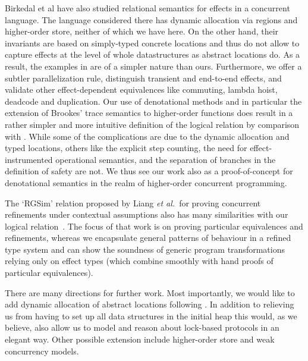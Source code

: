 \documentclass[nocopyrightspace,preprint]{sigplanconf}
\newcommand\etal{\emph{et al.}\xspace}
\begin{document}
Birkedal et al \cite{birkedal} have also studied relational semantics
for effects in a concurrent language. The language considered there has dynamic allocation via regions and higher-order store, neither of which we have here. On the other hand, their invariants are based on simply-typed concrete locations and thus do not allow to capture effects at the level of whole datastructures as abstract locations do. As a result, the examples in \cite{birkedal} are of a simpler nature than ours. Furthermore, we offer a subtler parallelization rule, distinguish transient and end-to-end effects, and validate other effect-dependent equivalences like commuting, lambda
hoist, deadcode and duplication. Our  use of denotational methods and in
particular the extension of Brookes' trace semantics to higher-order
functions does result in a rather simpler and more intuitive 
definition of the logical relation by
comparison with \cite{birkedal}. While some of the complications are  due to the
dynamic allocation and typed locations, others like the explicit step
counting, the need for effect-instrumented operational semantics, and the separation of
branches in the definition of safety are not. We thus see our work also as a proof-of-concept for
denotational semantics in the realm of higher-order concurrent
programming.


The `RGSim' relation proposed by Liang \etal\ for proving concurrent
refinements under contextual assumptions also has many similarities
with our logical relation~\cite[Def.4]{liangfengpopl12}. The focus of
that work is on proving particular equivalences and refinements,
whereas we encapsulate general patterns of behaviour in a refined type
system and can show the soundness of generic program transformations
relying only on effect types (which combine smoothly with hand proofs
of particular equivalences).

There are many directions for further work. Most importantly, we would
like to add dynamic allocation of abstract locations following
\cite{DBLP:dblp_conf/popl/Benton0N14}. In addition to relieving us
from having to set up all data structures in the initial heap this
would, as we believe, also allow us to model and reason about
lock-based protocols in an elegant way. Other possible extension
include higher-order store and weak concurrency models.

\newpage



\newpage 
\end{document}
